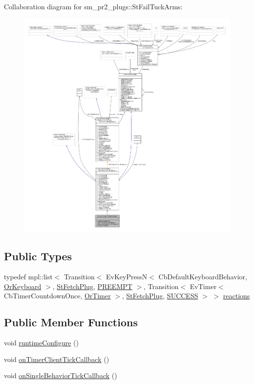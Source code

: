 Collaboration diagram for sm\+\_\+pr2\+\_\+plugs\+:\+:St\+Fail\+Tuck\+Arms\+:
\nopagebreak
\begin{figure}[H]
\begin{center}
\leavevmode
\includegraphics[width=350pt]{structsm__pr2__plugs_1_1StFailTuckArms__coll__graph}
\end{center}
\end{figure}
\subsection*{Public Types}
\begin{DoxyCompactItemize}
\item 
typedef mpl\+::list$<$ Transition$<$ Ev\+Key\+PressN$<$ Cb\+Default\+Keyboard\+Behavior, \hyperlink{classsm__pr2__plugs_1_1OrKeyboard}{Or\+Keyboard} $>$, \hyperlink{structsm__pr2__plugs_1_1StFetchPlug}{St\+Fetch\+Plug}, \hyperlink{classPREEMPT}{P\+R\+E\+E\+M\+PT} $>$, Transition$<$ Ev\+Timer$<$ Cb\+Timer\+Countdown\+Once, \hyperlink{classsm__pr2__plugs_1_1OrTimer}{Or\+Timer} $>$, \hyperlink{structsm__pr2__plugs_1_1StFetchPlug}{St\+Fetch\+Plug}, \hyperlink{classSUCCESS}{S\+U\+C\+C\+E\+SS} $>$ $>$ \hyperlink{structsm__pr2__plugs_1_1StFailTuckArms_a722dbc85911ba3976f94bbc08eb06eac}{reactions}
\end{DoxyCompactItemize}
\subsection*{Public Member Functions}
\begin{DoxyCompactItemize}
\item 
void \hyperlink{structsm__pr2__plugs_1_1StFailTuckArms_aa120c686b41ea5ab0e55d4545757cc1d}{runtime\+Configure} ()
\item 
void \hyperlink{structsm__pr2__plugs_1_1StFailTuckArms_a4ef9ad7a1e3f13c41ad1903cc642bcb5}{on\+Timer\+Client\+Tick\+Callback} ()
\item 
void \hyperlink{structsm__pr2__plugs_1_1StFailTuckArms_a2e1def8b4845fef3c8ddfed50a7077cc}{on\+Single\+Behavior\+Tick\+Callback} ()
\end{DoxyCompactItemize}
